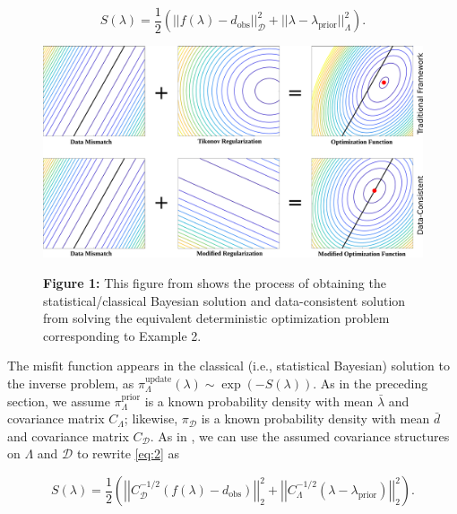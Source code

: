 \documentclass{amsart}
\begin{document}
\begin{equation} \label{eq:2}
S(\lambda)=\frac{1}{2}\left(||f(\lambda)-d_{\text{obs}}||_\mathcal{D}^2+||\lambda-\lambda_{\text{prior}}||_\Lambda^2\right).
\end{equation}

\begin{figure} 
\includegraphics[width=\textwidth]{Regularization-all-in-one.pdf}

\textbf{Figure 1:} This figure from \cite{wildeyprez} shows the process of obtaining the statistical/classical Bayesian solution and data-consistent solution from solving the equivalent deterministic optimization problem corresponding to Example 2.
\end{figure}

The misfit function appears in the classical (i.e., statistical Bayesian) solution to the inverse problem, as $\pi_\Lambda^\text{update}(\lambda) \sim \exp(-S(\lambda)).$ 
As in the preceding section, we assume $\pi_\Lambda^\text{prior}$ is a known probability density with mean $\bar{\lambda}$ and covariance matrix $C_\Lambda$; likewise, $\pi_\mathcal{D}$ is a known probability density with mean $\bar{d}$ and covariance matrix $C_\mathcal{D}$. As in \cite{Tarantola}, we can use the assumed covariance structures on $\Lambda$ and $\mathcal{D}$ to rewrite \eqref{eq:2} as


\begin{equation} \label{eq:3}
S(\lambda)=\frac{1}{2}\left(\left|\left|C_\mathcal{D}^{-1/2}(f(\lambda)-d_{\text{obs}})\right|\right|_2^2+\left|\left|C_\Lambda^{-1/2}(\lambda-\lambda_{\text{prior}})\right|\right|_2^2\right).
\end{equation} 
\end{document}
